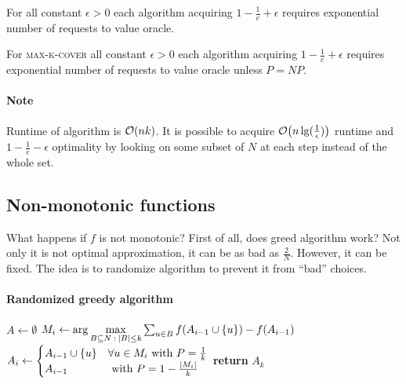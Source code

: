 \begin{theorem} 
	For all constant $\epsilon>0$ each algorithm acquiring $1-\frac{1}{e} + \epsilon$ requires exponential number of requests to value oracle.
\end{theorem}
\begin{theorem}
For \textsc{max-k-cover} all constant $\epsilon>0$ each algorithm acquiring $1-\frac{1}{e} + \epsilon$ requires exponential number of requests to value oracle unless $P=NP$.
\end{theorem}
\paragraph{Note} Runtime of algorithm is $\order{nk}$. It is possible to acquire $\order{n\lg(\frac{1}{\epsilon})}$ runtime and $1-\frac{1}{e}-\epsilon$ optimality by looking on some subset of $N$ at each step instead of the whole set. 
\subsection{Non-monotonic functions}
What happens if $f$ is not monotonic? First of all, does greed algorithm work? Not only it is not optimal approximation, it can be as bad as $\frac{2}{N}$. However, it can be fixed. The idea is to randomize algorithm to prevent it from ``bad'' choices.


\paragraph{Randomized greedy algorithm}
\begin{algorithm}
	\caption{}\label{rand_greedy}
	\begin{algorithmic}[1]
		\State $A \gets \emptyset$
		\State $ M_i \gets \arg\max\limits_{B\subseteq N \: : \: \abs{B} \leq k} \sum_{u\in B} f\qty(A_{i-1} \cup \qty{u} ) - f\qty(A_{i-1})$
		\State $ A_i \gets \begin{cases}
		A_{i-1} \cup \qty{u} & \forall u \in M_i \text{ with } P=\frac{1}{k}\\
		A_{i-1} & \text{ with } P=1-\frac{\abs{M_i}}{k}
		\end{cases} $
		\EndFor
		\State \textbf{return} $A_k$
		\EndProcedure
	\end{algorithmic}
\end{algorithm}

